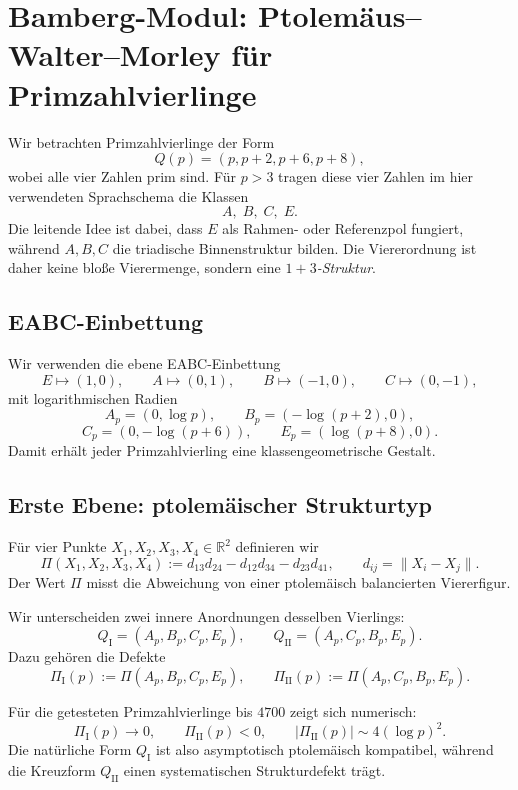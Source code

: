 \section{Bamberg-Modul: Ptolemäus--Walter--Morley für Primzahlvierlinge}

Wir betrachten Primzahlvierlinge der Form
\[
Q(p)=(p,p+2,p+6,p+8),
\]
wobei alle vier Zahlen prim sind. Für $p>3$ tragen diese vier Zahlen im hier verwendeten Sprachschema die Klassen
\[
A,\;B,\;C,\;E.
\]
Die leitende Idee ist dabei, dass $E$ als Rahmen- oder Referenzpol fungiert, während $A,B,C$ die triadische Binnenstruktur bilden. Die Viererordnung ist daher keine bloße Vierermenge, sondern eine \emph{$1+3$-Struktur}.

\subsection{EABC-Einbettung}

Wir verwenden die ebene EABC-Einbettung
\[
E \mapsto (1,0),\qquad
A \mapsto (0,1),\qquad
B \mapsto (-1,0),\qquad
C \mapsto (0,-1),
\]
mit logarithmischen Radien
\[
A_p=(0,\log p),\qquad B_p=(-\log(p+2),0),
\]
\[
C_p=(0,-\log(p+6)),\qquad E_p=(\log(p+8),0).
\]
Damit erhält jeder Primzahlvierling eine klassengeometrische Gestalt.

\subsection{Erste Ebene: ptolemäischer Strukturtyp}

\begin{definition}
Für vier Punkte $X_1,X_2,X_3,X_4\in\mathbb R^2$ definieren wir
\[
\Pi(X_1,X_2,X_3,X_4)
:= d_{13}d_{24}-d_{12}d_{34}-d_{23}d_{41},
\qquad d_{ij}=\|X_i-X_j\|.
\]
Der Wert $\Pi$ misst die Abweichung von einer ptolemäisch balancierten Viererfigur.
\end{definition}

Wir unterscheiden zwei innere Anordnungen desselben Vierlings:
\[
Q_{\mathrm I}=(A_p,B_p,C_p,E_p),
\qquad
Q_{\mathrm{II}}=(A_p,C_p,B_p,E_p).
\]
Dazu gehören die Defekte
\[
\Pi_{\mathrm I}(p):=\Pi(A_p,B_p,C_p,E_p),
\qquad
\Pi_{\mathrm{II}}(p):=\Pi(A_p,C_p,B_p,E_p).
\]

\begin{proposition}
Für die getesteten Primzahlvierlinge bis $4700$ zeigt sich numerisch:
\[
\Pi_{\mathrm I}(p)\to 0,
\qquad
\Pi_{\mathrm{II}}(p)<0,
\qquad
|\Pi_{\mathrm{II}}(p)|\sim 4(\log p)^2.
\]
Die natürliche Form $Q_{\mathrm I}$ ist also asymptotisch ptolemäisch kompatibel, während die Kreuzform $Q_{\mathrm{II}}$ einen systematischen Strukturdefekt trägt.
\end{proposition}

